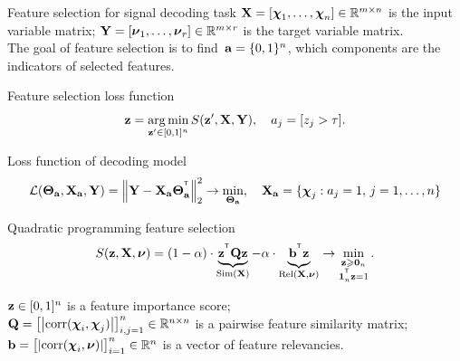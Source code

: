 \documentclass[10pt]{beamer}
\begin{document}
\begin{frame}{Feature selection for signal decoding task}
	$\mathbf{X} = [\boldsymbol{\chi}_1, \dots, \boldsymbol{\chi}_n] \in \mathbb{R}^{m \times n}$ is the input variable matrix; $\mathbf{Y} = [\boldsymbol{\nu}_1, \dots, \boldsymbol{\nu}_r] \in \mathbb{R}^{m \times r}$ is the target variable matrix. \\
	The goal of feature selection is to find~$\mathbf{a} = \{0, 1\}^n$, which components are the indicators of selected features. 
	\begin{block}{Feature selection loss function}
		\vspace{-0.3cm}
		\[
			\mathbf{z} = \mathop{\arg \min}\limits_{\mathbf{z}' \in [0, 1]^n} S(\mathbf{z}', \mathbf{X}, \mathbf{Y}), \quad 
		a_j = [z_j > \tau].
		\]
		\vspace{-0.2cm}
	\end{block}
	\begin{block}{Loss function of decoding model}
		\vspace{-0.6cm}
		\[
			\mathcal{L}(\boldsymbol{\Theta}_{\mathbf{a}}, \mathbf{X}_{\mathbf{a}}, \mathbf{Y}) = {\left\| \mathbf{Y} - \mathbf{X}_{\mathbf{a}}\boldsymbol{\Theta}^{^{\text{\tiny\sffamily\upshape\mdseries T}}}_{\mathbf{a}} \right\| }_2^2 \rightarrow\min_{\boldsymbol{\Theta}_{\mathbf{a}}}, \quad \mathbf{X}_{\mathbf{a}} = \{\boldsymbol{\chi}_j: a_j = 1, \, j = 1, \dots, n\}
		\]
		\vspace{-0.6cm}
	\end{block}
	\begin{block}{Quadratic programming feature selection}
	\vspace{-0.3cm}
	\[
	S(\mathbf{z}, \mathbf{X}, \boldsymbol{\nu}) = (1 - \alpha) \cdot \underbrace{\mathbf{z}^{^{\text{\tiny\sffamily\upshape\mdseries T}}} \mathbf{Q} \mathbf{z}}_{\text{Sim}(\mathbf{X})} - \alpha \cdot \underbrace{\vphantom{()} \mathbf{b}^{^{\text{\tiny\sffamily\upshape\mdseries T}}} \mathbf{z}}_{\text{Rel}(\mathbf{X}, \boldsymbol{\nu})} \rightarrow \min_{\substack{\mathbf{z} \geqslant \boldsymbol{0}_n \\ \boldsymbol{1}_n^{^{\text{\tiny\sffamily\upshape\mdseries T}}} \mathbf{z}=1}}.
	\]
	\vspace{-0.5cm}
	\end{block}
		$\mathbf{z} \in [0, 1]^n$ is a feature importance score; \\
		$\mathbf{Q} = \bigl[\left|\text{corr}(\boldsymbol{\chi}_i, \boldsymbol{\chi}_j)\right|\bigr]_{i,j=1}^n \in \mathbb{R}^{n \times n}$ is a pairwise feature similarity matrix; \\
		$\mathbf{b} = \bigl[\left|\text{corr}(\boldsymbol{\chi}_i, \boldsymbol{\nu})\right|\bigr]_{i=1}^n \in \mathbb{R}^n$ is a vector of feature relevancies. 
\end{frame}
\end{document}
